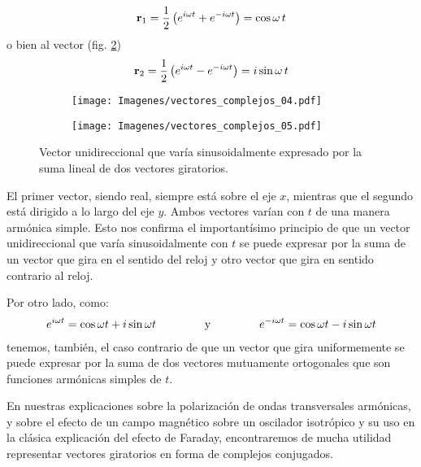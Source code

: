 \documentclass[12pt]{article}
\begin{document}
\begin{align}
    \vb{r}_{1} = \dfrac{1}{2} \left( e^{i \omega t} + e^{- i \omega t} \right) = \cos \omega \, t
    \label{eq:ecuacion_01_91}
\end{align}
o bien al vector (fig. \ref{fig:figura_01_26b}) 
\begin{align}
    \vb{r}_{2} = \dfrac{1}{2} \left( e^{i \omega t} - e^{- i \omega t} \right) = i \sin \omega \, t
    \label{eq:ecuacion_01_92}
\end{align}
\begin{figure}[H]
    \centering
    \begin{subfigure}[t]{0.5\textwidth}
        \centering
        \texttt{[image: Imagenes/vectores\_complejos\_04.pdf]}
        \caption{}
        \label{fig:figura_01_26a}
    \end{subfigure}%
    \begin{subfigure}[t]{0.5\textwidth}
        \centering
        \texttt{[image: Imagenes/vectores\_complejos\_05.pdf]}
        \caption{}
        \label{fig:figura_01_26b}
    \end{subfigure}
    \caption{Vector unidireccional que varía sinusoidalmente expresado por la suma lineal de dos vectores giratorios.}
        \label{fig:figura_01_26}
\end{figure}
El primer vector, siendo real, siempre está sobre el eje $x$, mientras que el segundo está dirigido a lo largo del eje $y$. Ambos vectores varían con $t$ de una manera armónica simple. Esto nos confirma el importantísimo principio de que un vector unidireccional que varía sinusoidalmente con $t$ se puede expresar por la suma de un vector que gira en el sentido del reloj y otro vector que gira en sentido contrario al reloj. 
\par
Por otro lado, como:
\begin{align*}
    e^{i \omega t} = \cos \omega t + i \sin \omega t \hspace{1.5cm} \text{y} \hspace{1.5cm} e^{-i \omega t} = \cos \omega t - i \sin \omega t
\end{align*}
tenemos, también, el caso contrario de que un vector que gira uniformemente se puede expresar por la suma de dos vectores mutuamente ortogonales que son funciones armónicas simples de $t$.
\par
En nuestras explicaciones sobre la polarización de ondas transversales armónicas, y sobre el efecto de un campo magnético sobre un oscilador isotrópico y su uso en la clásica explicación del efecto de Faraday, encontraremos de mucha utilidad representar vectores giratorios en forma de complejos conjugados. 
\end{document}
